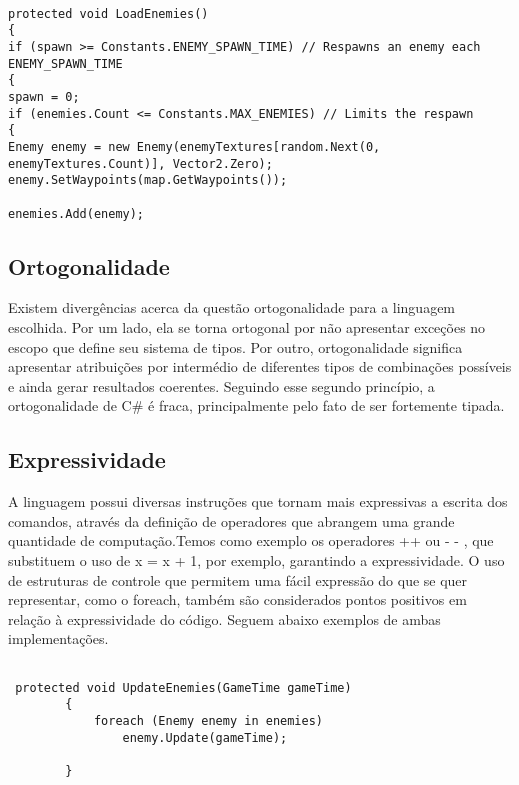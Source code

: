 \documentclass[rel_mlp]{iiufrgs}
\begin{document}
\begin{lstlisting}[caption=Trecho de código C\# retirado da implementação deste trabalho, label=lst:test]

protected void LoadEnemies()
{
if (spawn >= Constants.ENEMY_SPAWN_TIME) // Respawns an enemy each ENEMY_SPAWN_TIME
{
spawn = 0;
if (enemies.Count <= Constants.MAX_ENEMIES) // Limits the respawn
{
Enemy enemy = new Enemy(enemyTextures[random.Next(0, enemyTextures.Count)], Vector2.Zero);
enemy.SetWaypoints(map.GetWaypoints());

enemies.Add(enemy);

\end{lstlisting}

\subsection{Ortogonalidade}

Existem divergências acerca da questão ortogonalidade para a linguagem escolhida. Por um lado, ela se torna ortogonal por não apresentar exceções no escopo que define seu sistema de tipos. Por outro, ortogonalidade significa apresentar atribuições por intermédio de diferentes tipos de combinações possíveis e ainda gerar resultados coerentes. Seguindo esse segundo princípio, a ortogonalidade de C# é fraca, principalmente pelo fato de ser fortemente tipada. 

\subsection{Expressividade}

A linguagem possui diversas instruções que tornam mais expressivas a escrita dos comandos, através da definição de operadores que abrangem uma grande quantidade de computação.Temos como exemplo os operadores ++ ou - - , que substituem o uso de x = x + 1, por exemplo, garantindo a expressividade. O uso de estruturas de controle que permitem uma fácil expressão do que se quer representar, como o foreach, também são considerados pontos positivos em relação à expressividade do código. Seguem abaixo exemplos de ambas implementações.

\begin{lstlisting}[caption=Trecho de código C\# retirado da implementação deste trabalho, label=lst:test]

 protected void UpdateEnemies(GameTime gameTime)
        {
            foreach (Enemy enemy in enemies)
                enemy.Update(gameTime);

        }

\end{lstlisting}
\end{document}
